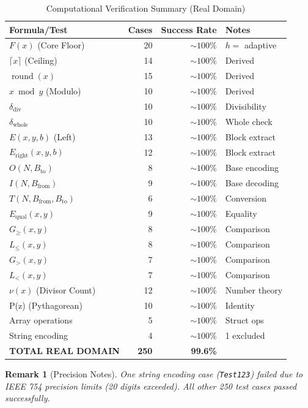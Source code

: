 \documentclass[12pt, a4paper]{article}
\theoremstyle{note}
\newtheorem{remark}{Remark}[section]
\begin{document}
\begin{table}[h!]
\centering
\caption{Computational Verification Summary (Real Domain)}
\begin{tabular}{l|r|r|l}
Formula/Test & Cases & Success Rate & Notes \\ \hline
$F(x)$ (Core Floor) & 20 & $\sim 100\%$ & $h=$ adaptive \\
$\lceil x \rceil$ (Ceiling) & 14 & $\sim 100\%$ & Derived \\
$\operatorname{round}(x)$ & 15 & $\sim 100\%$ & Derived \\
$x \bmod y$ (Modulo) & 10 & $\sim 100\%$ & Derived \\
$\delta_{\operatorname{div}}$ & 10 & $\sim 100\%$ & Divisibility \\
$\delta_{\operatorname{whole}}$ & 10 & $\sim 100\%$ & Whole check \\
$E(x,y,b)$ (Left) & 13 & $\sim 100\%$ & Block extract \\
$E_{\text{right}}(x,y,b)$ & 12 & $\sim 100\%$ & Block extract \\
$O(N, B_{\text{to}})$ & 8 & $\sim 100\%$ & Base encoding \\
$I(N, B_{\text{from}})$ & 9 & $\sim 100\%$ & Base decoding \\
$T(N, B_{\text{from}}, B_{\text{to}})$ & 6 & $\sim 100\%$ & Conversion \\
$E_{\operatorname{qual}}(x,y)$ & 9 & $\sim 100\%$ & Equality \\
$G_{\geq}(x,y)$ & 8 & $\sim 100\%$ & Comparison \\
$L_{\leq}(x,y)$ & 8 & $\sim 100\%$ & Comparison \\
$G_{>}(x,y)$ & 7 & $\sim 100\%$ & Comparison \\
$L_{<}(x,y)$ & 7 & $\sim 100\%$ & Comparison \\
$\nu(x)$ (Divisor Count) & 12 & $\sim 100\%$ & Number theory \\
P(z) (Pythagorean) & 10 & $\sim 100\%$ & Identity \\
Array operations & 5 & $\sim 100\%$ & Struct ops \\
String encoding & 4 & $\sim 100\%$ & 1 excluded \\ \hline
\textbf{TOTAL REAL DOMAIN} & \textbf{250} & \textbf{99.6\%} & \\
\end{tabular}
\end{table}

\begin{remark}[Precision Notes]
One string encoding case (\texttt{Test123}) failed due to IEEE 754 precision limits (20 digits exceeded). All other 250 test cases passed successfully.
\end{remark}
\end{document}
